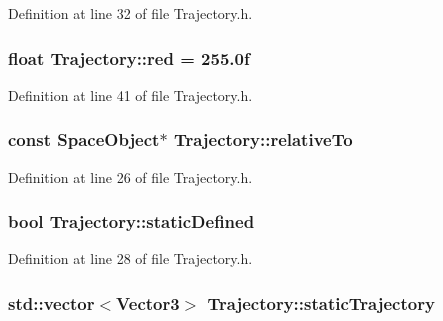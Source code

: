 Definition at line 32 of file Trajectory.\+h.

\hypertarget{class_trajectory_a3000185975d15a117e751eb9908593fe}{
\subsubsection[{red}]{\setlength{\rightskip}{0pt plus 5cm}float Trajectory\+::red = 255.\+0f\hspace{0.3cm}{\ttfamily [protected]}}}\label{class_trajectory_a3000185975d15a117e751eb9908593fe}


Definition at line 41 of file Trajectory.\+h.

\hypertarget{class_trajectory_aa0634363940b3bfa6c069a58b89fe975}{
\subsubsection[{relative\+To}]{\setlength{\rightskip}{0pt plus 5cm}const {\bf Space\+Object}$\ast$ Trajectory\+::relative\+To\hspace{0.3cm}{\ttfamily [protected]}}}\label{class_trajectory_aa0634363940b3bfa6c069a58b89fe975}


Definition at line 26 of file Trajectory.\+h.

\hypertarget{class_trajectory_a28f0f31968990bc14ef64093f863f15e}{
\subsubsection[{static\+Defined}]{\setlength{\rightskip}{0pt plus 5cm}bool Trajectory\+::static\+Defined\hspace{0.3cm}{\ttfamily [protected]}}}\label{class_trajectory_a28f0f31968990bc14ef64093f863f15e}


Definition at line 28 of file Trajectory.\+h.

\hypertarget{class_trajectory_a8a7ff5214ca817280dea38c3f5c62cbf}{
\subsubsection[{static\+Trajectory}]{\setlength{\rightskip}{0pt plus 5cm}std\+::vector$<${\bf Vector3}$>$ Trajectory\+::static\+Trajectory\hspace{0.3cm}{\ttfamily [protected]}}}\label{class_trajectory_a8a7ff5214ca817280dea38c3f5c62cbf}


